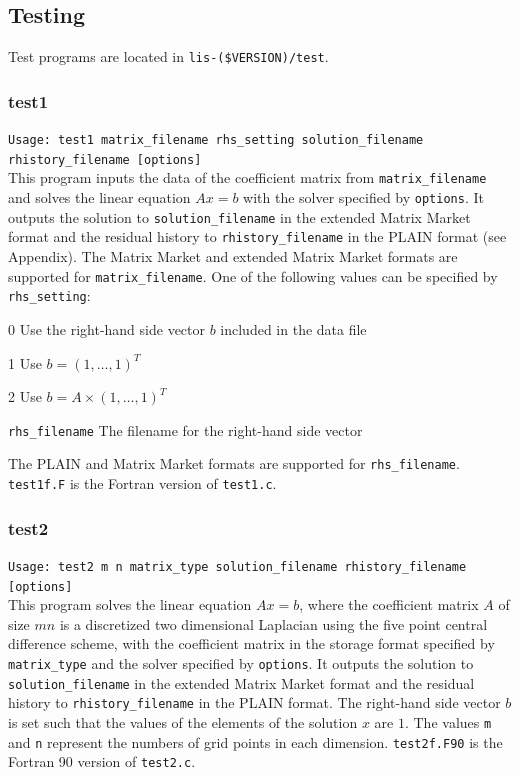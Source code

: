 \documentclass[a4paper]{article}
\newcommand{\namelistlabel}[1]{\mbox{#1}\hfill}
\newenvironment{namelist}[1]{%
\begin{list}{}
  {\let\makelabel\namelistlabel
  \settowidth{\labelwidth}{#1}
  \setlength{\leftmargin}{1.1\labelwidth}}
  }{%
\end{list}}
\begin{document}
\subsection{Testing}

Test programs are located in {\tt lis-(\$VERSION)/test}.

\subsubsection{test1}

\verb+Usage: test1 matrix_filename rhs_setting solution_filename rhistory_filename [options]+\\

This program inputs the data of the coefficient matrix from {\tt matrix\_filename} and solves the linear equation $Ax=b$ with 
the solver specified by {\tt options}. 
It outputs the solution to 
{\tt solution\_filename} in the extended 
Matrix Market format and 
the residual history to {\tt rhistory\_filename} in the PLAIN format (see Appendix). 
The Matrix Market and extended Matrix Market formats are supported 
for {\tt matrix\_filename}. 
One of the following values can be specified by {\tt rhs\_setting}:
\begin{namelist}{XXXXXXXXXXXXXXXXXXXX}
\item[0] Use the right-hand side vector $b$ included in the data file
\item[1] Use $b = (1,\dots,1)^T$
\item[2] Use $b = A \times (1,\dots,1)^T$
\item[\tt rhs\_filename] The filename for the right-hand side vector 
\end{namelist}
The PLAIN and Matrix Market formats are supported for {\tt rhs\_filename}. 
{\tt test1f.F} is the Fortran version of {\tt test1.c}.

\subsubsection{test2}

\verb+Usage: test2 m n matrix_type solution_filename rhistory_filename [options]+\\

This program solves the linear equation $Ax = b$, where the coefficient 
matrix $A$ of size $mn$ is a discretized two dimensional 
Laplacian using the five
point central difference scheme, with the coefficient matrix 
in the storage format specified
by \verb|matrix_type| and the solver specified by {\tt options}. 
It outputs the solution to {\tt solution\_filename} in the extended 
Matrix Market format and 
the residual history to {\tt rhistory\_filename} in the PLAIN format. 
The right-hand side vector $b$ is set such that the values of the elements
of the solution $x$ are $1$. 
The values {\tt m} and  {\tt n} represent the numbers of grid points
in each dimension. 
{\tt test2f.F90} is the Fortran 90 version of {\tt test2.c}.
\end{document}
